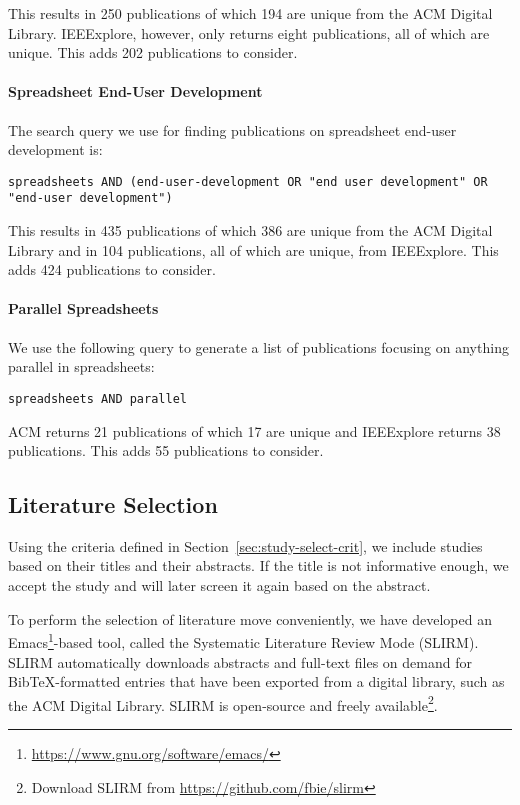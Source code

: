 \documentclass[a4paper]{article}
\begin{document}
\noindent This results in 250 publications of which 194 are unique from the ACM
Digital Library. IEEExplore, however, only returns eight publications,
all of which are unique. This adds 202 publications to consider.

\paragraph{Spreadsheet End-User Development}

The search query we use for finding publications on spreadsheet
end-user development is:

\begin{lstlisting}
spreadsheets AND (end-user-development OR "end user development" OR "end-user development")
\end{lstlisting}

\noindent This results in 435 publications of which 386 are unique from the ACM
Digital Library and in 104 publications, all of which are unique, from
IEEExplore. This adds 424 publications to consider.

\paragraph{Parallel Spreadsheets}

We use the following query to generate a list of publications focusing
on anything parallel in spreadsheets:

\begin{lstlisting}
spreadsheets AND parallel
\end{lstlisting}

\noindent ACM returns 21 publications of which 17 are unique and
IEEExplore returns 38 publications. This adds 55 publications to
consider.

\subsection{Literature Selection}
\label{sec:literature-selection}

Using the criteria defined in Section~\ref{sec:study-select-crit}, we
include studies based on their titles and their abstracts. If the
title is not informative enough, we accept the study and will later
screen it again based on the abstract.

To perform the selection of literature move conveniently, we have
developed an
Emacs\footnote{\url{https://www.gnu.org/software/emacs/}}-based tool,
called the Systematic Literature Review Mode (SLIRM). SLIRM
automatically downloads abstracts and full-text files on demand for
BibTeX-formatted entries that have been exported from a digital
library, such as the ACM Digital Library. SLIRM is open-source and
freely available\footnote{Download SLIRM from
  \url{https://github.com/fbie/slirm}}.
\end{document}
